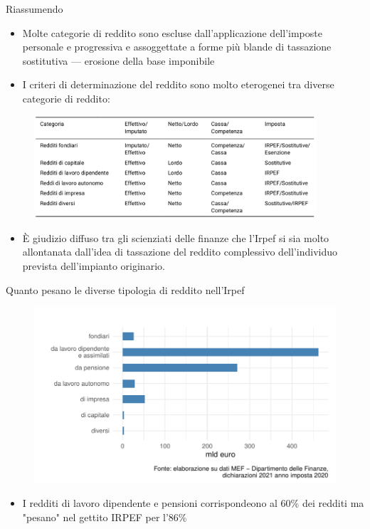 \documentclass[aspectratio=64,12pt]{beamer}
\newcommand\€{\,\text{€}}
\begin{document}
\begin{frame}{Riassumendo}
\begin{itemize}
\item Molte categorie di reddito sono escluse dall'applicazione dell'imposte
personale e progressiva e assoggettate a forme più blande di tassazione
sostitutiva --- \alert{erosione} della base imponibile
\item I criteri di determinazione del reddito sono molto eterogenei tra diverse
categorie di reddito:
\end{itemize}

\begin{figure}
\centering
\includegraphics[height=3.8cm]{./figure/categorie-di-reddito-Irpef.png}
\end{figure}


\begin{itemize}
\item È giudizio diffuso tra gli scienziati delle finanze che l'Irpef si sia molto
allontanata dall'idea di tassazione del reddito \alert{complessivo} dell'individuo
prevista dell'impianto originario.
\end{itemize}
\end{frame}

\begin{frame}{Quanto pesano le diverse tipologia di reddito nell'Irpef}
\vspace{-3mm}
\begin{figure}
  \includegraphics[width=.9\textwidth]{./figure/redditi-dichiarati-per-tipologia-2020-color.pdf}
\end{figure}

\begin{itemize}
\item I redditi di lavoro dipendente e pensioni corrispondeono al 60\% dei redditi
ma "pesano" nel gettito IRPEF per l'86\%
\end{itemize}
\end{frame}
\end{document}
